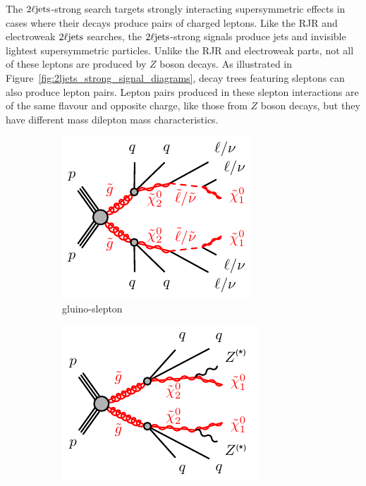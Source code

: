 The $2\ell\mathrm{jets}$-strong search targets strongly interacting supersymmetric
effects in cases where their decays produce pairs of charged leptons.
Like the RJR and electroweak $2\ell\mathrm{jets}$ searches, the $2\ell\mathrm{jets}$-strong
signals produce jets and invisible lightest supersymmetric particles.
Unlike the RJR and electroweak parts, not all of these leptons are produced
by $Z$ boson decays.
As illustrated in Figure~\ref{fig:2ljets_strong_signal_diagrams}, decay trees
featuring sleptons can also produce lepton pairs.
Lepton pairs produced in these slepton interactions are of the same flavour
and opposite charge, like those from $Z$ boson decays, but they have different
mass dilepton mass characteristics.

\begin{figure}[tp]
\centering
\begin{subfigure}{0.48\textwidth}
\centering
\includegraphics[width=\textwidth]{figures/2ljets_strong_gogo_qqqqllllN1N1_N2.pdf}
\caption{gluino-slepton}
\end{subfigure}
\hfill
\begin{subfigure}{0.47\textwidth}
\centering
\includegraphics[width=\textwidth]{figures/2ljets_strong_gogo_qqqqZZN1N1.pdf}

\end{subfigure}
\end{figure}
